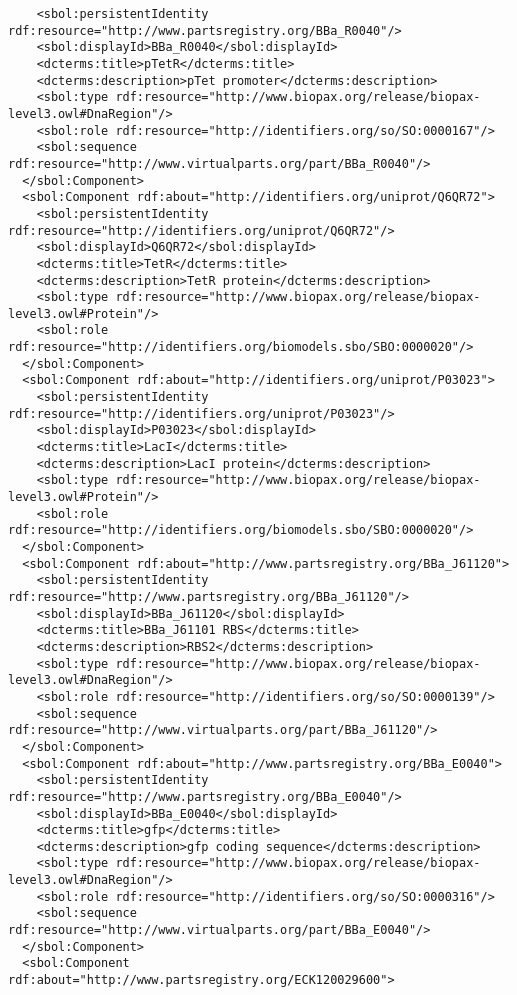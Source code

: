 \begin{lstlisting}
    <sbol:persistentIdentity rdf:resource="http://www.partsregistry.org/BBa_R0040"/>
    <sbol:displayId>BBa_R0040</sbol:displayId>
    <dcterms:title>pTetR</dcterms:title>
    <dcterms:description>pTet promoter</dcterms:description>
    <sbol:type rdf:resource="http://www.biopax.org/release/biopax-level3.owl#DnaRegion"/>
    <sbol:role rdf:resource="http://identifiers.org/so/SO:0000167"/>
    <sbol:sequence rdf:resource="http://www.virtualparts.org/part/BBa_R0040"/>
  </sbol:Component>
  <sbol:Component rdf:about="http://identifiers.org/uniprot/Q6QR72">
    <sbol:persistentIdentity rdf:resource="http://identifiers.org/uniprot/Q6QR72"/>
    <sbol:displayId>Q6QR72</sbol:displayId>
    <dcterms:title>TetR</dcterms:title>
    <dcterms:description>TetR protein</dcterms:description>
    <sbol:type rdf:resource="http://www.biopax.org/release/biopax-level3.owl#Protein"/>
    <sbol:role rdf:resource="http://identifiers.org/biomodels.sbo/SBO:0000020"/>
  </sbol:Component>
  <sbol:Component rdf:about="http://identifiers.org/uniprot/P03023">
    <sbol:persistentIdentity rdf:resource="http://identifiers.org/uniprot/P03023"/>
    <sbol:displayId>P03023</sbol:displayId>
    <dcterms:title>LacI</dcterms:title>
    <dcterms:description>LacI protein</dcterms:description>
    <sbol:type rdf:resource="http://www.biopax.org/release/biopax-level3.owl#Protein"/>
    <sbol:role rdf:resource="http://identifiers.org/biomodels.sbo/SBO:0000020"/>
  </sbol:Component>
  <sbol:Component rdf:about="http://www.partsregistry.org/BBa_J61120">
    <sbol:persistentIdentity rdf:resource="http://www.partsregistry.org/BBa_J61120"/>
    <sbol:displayId>BBa_J61120</sbol:displayId>
    <dcterms:title>BBa_J61101 RBS</dcterms:title>
    <dcterms:description>RBS2</dcterms:description>
    <sbol:type rdf:resource="http://www.biopax.org/release/biopax-level3.owl#DnaRegion"/>
    <sbol:role rdf:resource="http://identifiers.org/so/SO:0000139"/>
    <sbol:sequence rdf:resource="http://www.virtualparts.org/part/BBa_J61120"/>
  </sbol:Component>
  <sbol:Component rdf:about="http://www.partsregistry.org/BBa_E0040">
    <sbol:persistentIdentity rdf:resource="http://www.partsregistry.org/BBa_E0040"/>
    <sbol:displayId>BBa_E0040</sbol:displayId>
    <dcterms:title>gfp</dcterms:title>
    <dcterms:description>gfp coding sequence</dcterms:description>
    <sbol:type rdf:resource="http://www.biopax.org/release/biopax-level3.owl#DnaRegion"/>
    <sbol:role rdf:resource="http://identifiers.org/so/SO:0000316"/>
    <sbol:sequence rdf:resource="http://www.virtualparts.org/part/BBa_E0040"/>
  </sbol:Component>
  <sbol:Component rdf:about="http://www.partsregistry.org/ECK120029600">

\end{lstlisting}

